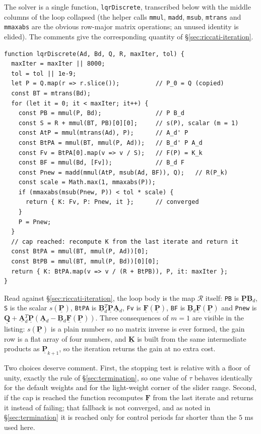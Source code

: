 \documentclass[12pt]{article}
\newcommand{\mb}[1]{\underline{\mathbf{#1}}}
\begin{document}
The solver is a single function, \texttt{lqrDiscrete}, transcribed below with the middle columns of the loop collapsed (the helper calls \texttt{mmul}, \texttt{madd}, \texttt{msub}, \texttt{mtrans} and \texttt{mmaxabs} are the obvious row-major matrix operations; an unused identity is elided). The comments give the corresponding quantity of \S\ref{sec:riccati-iteration}.

{\small
\begin{verbatim}
function lqrDiscrete(Ad, Bd, Q, R, maxIter, tol) {
  maxIter = maxIter || 8000;
  tol = tol || 1e-9;
  let P = Q.map(r => r.slice());          // P_0 = Q (copied)
  const BT = mtrans(Bd);
  for (let it = 0; it < maxIter; it++) {
    const PB = mmul(P, Bd);               // P B_d
    const S = R + mmul(BT, PB)[0][0];     // s(P), scalar (m = 1)
    const AtP = mmul(mtrans(Ad), P);      // A_d' P
    const BtPA = mmul(BT, mmul(P, Ad));   // B_d' P A_d
    const Fv = BtPA[0].map(v => v / S);   // F(P) = K_k
    const BF = mmul(Bd, [Fv]);            // B_d F
    const Pnew = madd(mmul(AtP, msub(Ad, BF)), Q);   // R(P_k)
    const scale = Math.max(1, mmaxabs(P));
    if (mmaxabs(msub(Pnew, P)) < tol * scale) {
      return { K: Fv, P: Pnew, it };      // converged
    }
    P = Pnew;
  }
  // cap reached: recompute K from the last iterate and return it
  const BtPA = mmul(BT, mmul(P, Ad))[0];
  const BtPB = mmul(BT, mmul(P, Bd))[0][0];
  return { K: BtPA.map(v => v / (R + BtPB)), P, it: maxIter };
}
\end{verbatim}
}

 Read against \S\ref{sec:riccati-iteration}, the loop body is the map $\mathcal{R}$ itself: \texttt{PB} is $\mb{P}\mb{B}{}_d$, \texttt{S} is the scalar $s(\mb{P})$, \texttt{BtPA} is $\mb{B}{}_d^T\mb{P}\mb{A}{}_d$, \texttt{Fv} is $\mb{F}(\mb{P})$, \texttt{BF} is $\mb{B}{}_d\mb{F}(\mb{P})$ and \texttt{Pnew} is $\mb{Q} + \mb{A}{}_d^T\mb{P}(\mb{A}{}_d - \mb{B}{}_d\mb{F}(\mb{P}))$. Three consequences of $m = 1$ are visible in the listing: $s(\mb{P})$ is a plain number so no matrix inverse is ever formed, the gain row is a flat array of four numbers, and $\mb{K}$ is built from the same intermediate products as $\mb{P}_{k+1}$, so the iteration returns the gain at no extra cost.

Two choices deserve comment. First, the stopping test is relative with a floor of unity, exactly the rule of \S\ref{sec:termination}, so one value of $\tau$ behaves identically for the default weights and for the light-weight corner of the slider range. Second, if the cap is reached the function recomputes $\mb{F}$ from the last iterate and returns it instead of failing; that fallback is not converged, and as noted in \S\ref{sec:termination} it is reached only for control periods far shorter than the $5$ ms used here.
\end{document}
